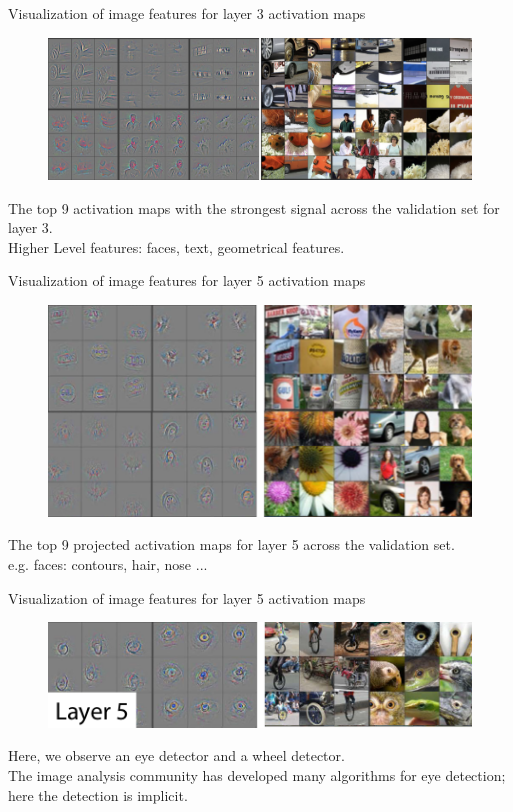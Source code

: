 \documentclass[xcolor=pdftex,dvipsnames,table]{beamer}
\begin{document}
\begin{frame}{Visualization of image features for layer 3 activation maps}
\begin{figure}[htb]
  \centering
  \includegraphics[width=\textwidth]{../graphics/Vis_Layer3_activationmaps.png}
\end{figure}
The top 9 activation maps with the strongest signal across the validation set for layer 3. \\
Higher Level features: faces, text, geometrical features.
\end{frame}

\begin{frame}{Visualization of image features for layer 5 activation maps}
\begin{figure}[htb]
  \centering
  \includegraphics[width=\textwidth]{../graphics/Vis_Layer5_activationmaps.png}
\end{figure}
The top 9 projected activation maps for layer 5 across the validation set. \\
e.g. faces: contours, hair, nose ... 
\end{frame}

\begin{frame}{Visualization of image features for layer 5 activation maps}
\begin{figure}[htb]
  \centering
  \includegraphics[width=\textwidth]{../graphics/Vis_Layer5_activationmaps_c.png}
\end{figure}
Here, we observe an eye detector and a wheel detector. \\
The image analysis community has developed many algorithms for eye detection; here the detection is implicit.
\end{frame}
\end{document}
